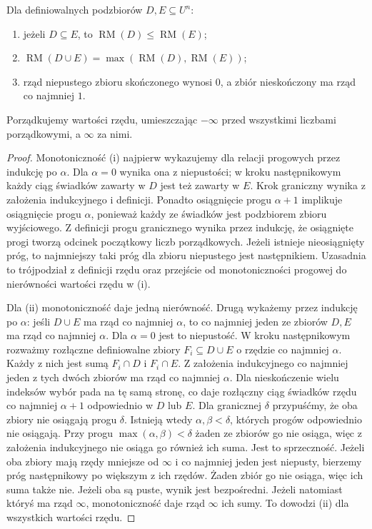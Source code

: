 \begin{lemat}
\label{lem:mod-morley-rank-laws}
Dla definiowalnych podzbiorów $D,E\subseteq U^n$:
\begin{enumerate}[label=(\roman*)]
\item jeżeli $D\subseteq E$, to
$\operatorname{RM}(D)\leq\operatorname{RM}(E)$;
\item $\operatorname{RM}(D\cup E)=
\max(\operatorname{RM}(D),\operatorname{RM}(E))$;
\item rząd niepustego zbioru skończonego wynosi $0$,
a zbiór nieskończony ma rząd co najmniej $1$.
\end{enumerate}
Porządkujemy wartości rzędu, umieszczając $-\infty$
przed wszystkimi liczbami porządkowymi, a $\infty$
za nimi.
\end{lemat}
\begin{proof}
Monotoniczność (i) najpierw wykazujemy dla
relacji progowych przez indukcję po $\alpha$.
Dla $\alpha=0$ wynika ona z niepustości;
w kroku następnikowym każdy ciąg świadków
zawarty w $D$ jest też zawarty w $E$.
Krok graniczny wynika z założenia indukcyjnego
i definicji. Ponadto osiągnięcie progu $\alpha+1$
implikuje osiągnięcie progu $\alpha$, ponieważ
każdy ze świadków jest podzbiorem zbioru wyjściowego.
Z definicji progu granicznego wynika przez
indukcję, że osiągnięte progi tworzą odcinek
początkowy liczb porządkowych. Jeżeli istnieje
nieosiągnięty próg, to najmniejszy taki próg
dla zbioru niepustego jest następnikiem.
Uzasadnia to trójpodział z definicji rzędu
oraz przejście od monotoniczności progowej
do nierówności wartości rzędu w (i).

Dla (ii) monotoniczność daje jedną nierówność.
Drugą wykażemy przez indukcję po $\alpha$:
jeśli $D\cup E$ ma rząd co najmniej $\alpha$,
to co najmniej jeden ze zbiorów $D,E$
ma rząd co najmniej $\alpha$.
Dla $\alpha=0$ jest to niepustość.
W kroku następnikowym rozważmy rozłączne
definiowalne zbiory $F_i\subseteq D\cup E$
o rzędzie co najmniej $\alpha$.
Każdy z nich jest sumą $F_i\cap D$ i $F_i\cap E$.
Z założenia indukcyjnego co najmniej jeden
z tych dwóch zbiorów ma rząd co najmniej $\alpha$.
Dla nieskończenie wielu indeksów wybór pada
na tę samą stronę, co daje rozłączny ciąg
świadków rzędu co najmniej $\alpha+1$
odpowiednio w $D$ lub $E$.
Dla granicznej $\delta$ przypuśćmy,
że oba zbiory nie osiągają progu $\delta$.
Istnieją wtedy $\alpha,\beta<\delta$,
których progów odpowiednio nie osiągają.
Przy progu $\max(\alpha,\beta)<\delta$
żaden ze zbiorów go nie osiąga, więc
z założenia indukcyjnego nie osiąga go
również ich suma. Jest to sprzeczność.
Jeżeli oba zbiory mają rzędy mniejsze od $\infty$
i co najmniej jeden jest niepusty, bierzemy próg
następnikowy po większym z ich rzędów.
Żaden zbiór go nie osiąga, więc ich suma także nie.
Jeżeli oba są puste, wynik jest bezpośredni.
Jeżeli natomiast któryś ma rząd $\infty$,
monotoniczność daje rząd $\infty$ ich sumy.
To dowodzi (ii) dla wszystkich wartości rzędu.


\end{proof}
